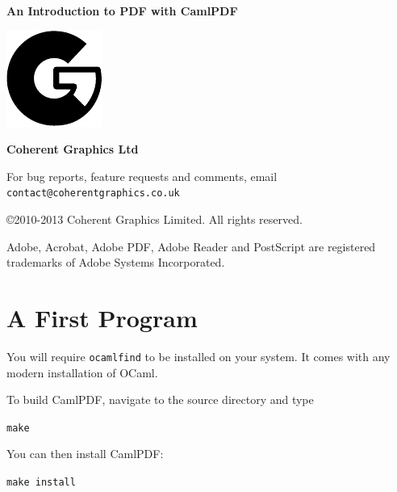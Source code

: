 \documentclass[a4paper]{memoir}
\newcommand{\smallgap}{\vspace{4mm}}
\begin{document}
\frontmatter
\thispagestyle{empty}

\begin{flushright}

{\sffamily \bfseries \Huge An Introduction to PDF with CamlPDF}


\vfill

\includegraphics{logo.pdf}

\vspace{2mm}
{\sffamily \bfseries \LARGE Coherent Graphics Ltd}

\end{flushright}

\clearpage

\thispagestyle{empty}
\noindent For bug reports, feature requests and comments, email\\ \texttt{contact@coherentgraphics.co.uk}

\vspace*{\fill}
\noindent\copyright 2010-2013 Coherent Graphics Limited. All rights reserved.

\smallgap 
\noindent Adobe, Acrobat, Adobe PDF, Adobe Reader and PostScript are
registered trademarks of Adobe Systems Incorporated.

\cleardoublepage

\mainmatter

\pagestyle{ruled}
\section*{A First Program}
You will require \texttt{ocamlfind} to be installed on your system. It comes with any modern installation of OCaml.

To build \textsf{CamlPDF}, navigate to the source directory and type
\begin{framed}
\verb!make!
\end{framed}

\noindent You can then install \textsf{CamlPDF}:
\begin{framed}
\verb!make install!
\end{framed}
\end{document}

